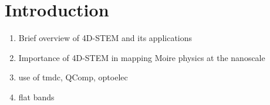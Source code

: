 \section{Introduction}
\begin{enumerate}


    \item Brief overview of 4D-STEM and its applications
    \item Importance of 4D-STEM in mapping Moire physics at the nanoscale
    \item use of tmdc, QComp, optoelec
    \item flat bands
\end{enumerate}
